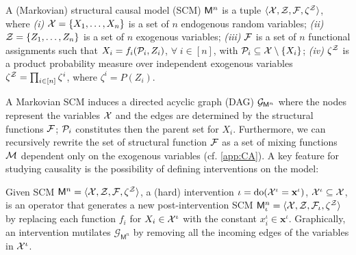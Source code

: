\begin{definition}\label{def:SCM}
A (Markovian) structural causal model (SCM) $\mathsf{M}^n$ is a tuple $\langle \mathcal{X}, \mathcal{Z}, \mathcal{F}, \zeta^\mathcal{Z} \rangle$, where \emph{(i)} $\mathcal{X} = \{X_1, \ldots, X_n\}$ is a set of $n$ endogenous random variables; \emph{(ii)} $\mathcal{Z} =\{Z_1,\ldots,Z_n\}$ is a set of $n$ exogenous variables; \emph{(iii)} $\mathcal{F}$ is a set of $n$ functional assignments such that $X_i=f_i(\mathcal{P}_i, Z_i)$, $\forall \; i \in [n]$, with $ \mathcal{P}_i \subseteq \mathcal{X} \setminus \{ X_i\}$; \emph{(iv)} $\zeta^\mathcal{Z}$ is a product probability measure over independent exogenous variables $\zeta^\mathcal{Z}=\prod_{i \in [n]} \zeta^i$, where $\zeta^i=P(Z_i)$. 
\end{definition}
A Markovian SCM induces a directed acyclic graph (DAG) $\mathcal{G}_{\mathsf{M}^n}$ where the nodes represent the variables $\mathcal{X}$ and the edges are determined by the structural functions $\mathcal{F}$; $ \mathcal{P}_i$ constitutes then the parent set for $X_i$. Furthermore, we can recursively rewrite the set of structural function $\mathcal{F}$ as a set of mixing functions $\mathcal{M}$ dependent only on the exogenous variables (cf. \cref{app:CA}). A key feature for studying causality is the possibility of defining interventions on the model:
\begin{definition}\label{def:intervention}
Given SCM $\mathsf{M}^n = \langle \mathcal{X}, \mathcal{Z}, \mathcal{F}, \zeta^\mathcal{Z} \rangle$, a (hard) intervention $\iota = \operatorname{do}(\mathcal{X}^{\iota} = \mathbf{x}^{\iota})$, $\mathcal{X}^{\iota}\subseteq \mathcal{X}$,
is an operator that generates a new post-intervention SCM $\mathsf{M}^n_\iota = \langle \mathcal{X}, \mathcal{Z}, \mathcal{F}_\iota, \zeta^\mathcal{Z} \rangle$ by replacing each function $f_i$ for $X_i\in\mathcal{X}^{\iota}$ with the constant $x_i^\iota\in \mathbf{x}^\iota$. 
Graphically, an intervention mutilates $\mathcal{G}_{\mathsf{M}^n}$ by removing all the incoming edges of the variables in $\mathcal{X}^{\iota}$.
\end{definition}

